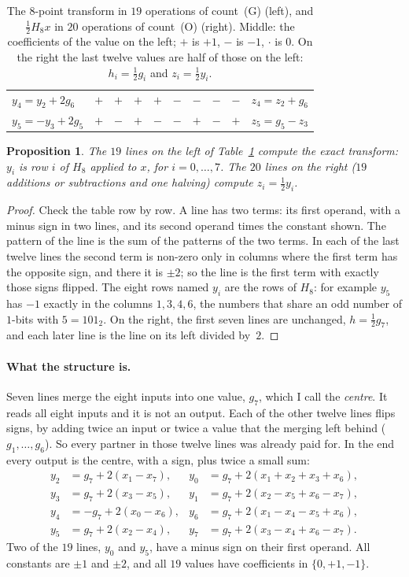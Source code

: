 \documentclass[10pt]{article}
\newtheorem{proposition}{Proposition}
\theoremstyle{remark}
\newcommand{\cntG}{\textup{(G)}}
\newcommand{\cntO}{\textup{(O)}}
\newcommand{\p}{$+$}
\newcommand{\m}{$-$}
\newcommand{\z}{$\cdot$}
\begin{document}
\begin{table}[ht]
\begin{tabular}{@{}l@{\qquad}cccccccc@{\qquad}l@{}}
$y_{4}=y_{2}+2g_{6}$ & \p&\p&\p&\p&\m&\m&\m&\m & $z_{4}=z_{2}+g_{6}$\\
$y_{5}=-y_{3}+2g_{5}$ & \p&\m&\p&\m&\m&\p&\m&\p & $z_{5}=g_{5}-z_{3}$\\
\bottomrule
\end{tabular}
\caption{The $8$-point transform in $19$ operations of count~\cntG{} (left), and $\tfrac12H_8x$ in $20$
operations of count~\cntO{} (right). Middle: the coefficients of the value on the left; \p{} is $+1$, \m{} is
$-1$, \z{} is $0$. On the right the last twelve values are half of those on the left: $h_i=\tfrac12g_i$
and $z_i=\tfrac12y_i$.}
\label{tab:h8}
\end{table}

\begin{proposition}\label{prop:19}
The $19$ lines on the left of Table~\ref{tab:h8} compute the exact transform: $y_i$ is row $i$ of $H_8$
applied to $x$, for $i=0,\dots,7$. The $20$ lines on the right ($19$ additions or subtractions and one
halving) compute $z_i=\tfrac12 y_i$.
\end{proposition}

\begin{proof}
Check the table row by row. A line has two terms: its first operand, with a minus sign in two lines, and
its second operand times the constant shown. The pattern of the line is the sum of the patterns of the two
terms. In each of the last twelve lines the second term is non-zero only in columns where the first term has
the opposite sign, and there it is $\pm2$; so the line is the first term with exactly those signs flipped.
The eight rows named $y_i$ are the rows of $H_8$: for example $y_5$ has $-1$ exactly
in the columns $1,3,4,6$, the numbers that share an odd number of $1$-bits with $5=101_2$. On the right, the
first seven lines are unchanged, $h=\tfrac12g_7$, and each later line is the line on its left divided by~$2$.
\end{proof}

\paragraph{What the structure is.}
Seven lines merge the eight inputs into one value, $g_7$, which I call the \emph{centre}. It reads all
eight inputs and it is not an output. Each of the other twelve lines flips signs, by adding twice an input
or twice a value that the merging left behind ($g_1,\dots,g_6$). So every partner in those twelve lines was
already paid for. In the end every output is the centre, with a sign, plus twice a small sum:
\[
\begin{aligned}
y_2&=g_7+2(x_1-x_7), & y_0&=g_7+2(x_1+x_2+x_3+x_6),\\
y_3&=g_7+2(x_3-x_5), & y_1&=g_7+2(x_2-x_5+x_6-x_7),\\
y_4&=-g_7+2(x_0-x_6), & y_6&=g_7+2(x_1-x_4-x_5+x_6),\\
y_5&=g_7+2(x_2-x_4), & y_7&=g_7+2(x_3-x_4+x_6-x_7).
\end{aligned}
\]
Two of the $19$ lines, $y_0$ and $y_5$, have a minus sign on their first operand. All constants are $\pm1$ and
$\pm2$, and all $19$ values have coefficients in $\{0,+1,-1\}$.
\end{document}
